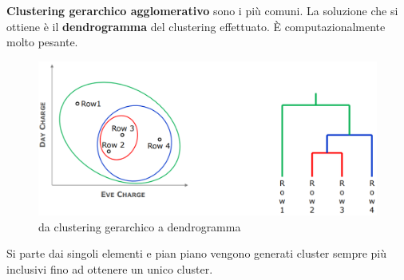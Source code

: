 \textbf{Clustering gerarchico agglomerativo} sono i pi\`u comuni. La soluzione che si ottiene \`e il \textbf{dendrogramma} del clustering effettuato. \`E computazionalmente molto pesante.

\begin{figure}[h!]
	\centering
	\includegraphics[height=0.45 \linewidth]{clustering/pict/cluster_aggl.png}
	\caption{da clustering gerarchico a dendrogramma}
\end{figure}

Si parte dai singoli elementi e pian piano vengono generati cluster sempre pi\`u inclusivi fino ad ottenere un unico cluster. \\


